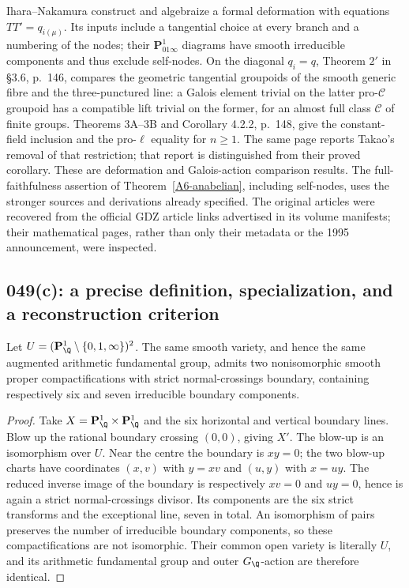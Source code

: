 Ihara--Nakamura \cite[\S2.3.6, equation $(5_\mu)$, p.~131;
Theorems 1 and $1'$, pp.~132--133]{IharaNakamura1997A567}
construct and algebraize a formal deformation with equations
$TT'=q_{i(\mu)}$. Its inputs include a tangential choice at every
branch and a numbering of the nodes; their $\mathbf P^1_{01\infty}$
diagrams have smooth irreducible components and thus exclude self-nodes.
On the diagonal $q_i=q$, Theorem $2'$ in \S3.6, p.~146, compares
the geometric tangential groupoids of the smooth generic fibre and
the three-punctured line: a Galois element trivial on the latter
pro-$\mathcal C$ groupoid has a compatible lift trivial on the former,
for an almost full class $\mathcal C$ of finite groups.
Theorems 3A--3B and Corollary 4.2.2, p.~148, give the constant-field
inclusion and the pro-$\ell$ equality for $n\ge1$.
The same page reports Takao's removal of that restriction;
that report is distinguished from their proved corollary.
These are deformation and Galois-action comparison results.
The full-faithfulness assertion of Theorem~\ref{A6-anabelian}, including
self-nodes, uses the stronger sources and derivations already specified.
The original articles were recovered from the official GDZ
article links advertised in its volume manifests; their mathematical
pages, rather than only their metadata or the 1995 announcement,
were inspected.

\subsection{049(c): a precise definition, specialization, and a reconstruction criterion}
\begin{proposition}\label{A6-blowup}
Let $U=(\mathbf P^1_\Q\setminus\{0,1,\infty\})^2$. The same smooth variety, and hence the same augmented arithmetic fundamental group, admits two nonisomorphic smooth proper compactifications with strict normal-crossings boundary, containing respectively six and seven irreducible boundary components.
\end{proposition}
\begin{proof}
Take $X=\mathbf P^1_\Q\times\mathbf P^1_\Q$ and the six horizontal and vertical boundary lines. Blow up the rational boundary crossing $(0,0)$, giving $X'$. The blow-up is an isomorphism over $U$. Near the centre the boundary is $xy=0$; the two blow-up charts have coordinates $(x,v)$ with $y=xv$ and $(u,y)$ with $x=uy$. The reduced inverse image of the boundary is respectively $xv=0$ and $uy=0$, hence is again a strict normal-crossings divisor. Its components are the six strict transforms and the exceptional line, seven in total. An isomorphism of pairs preserves the number of irreducible boundary components, so these compactifications are not isomorphic. Their common open variety is literally $U$, and its arithmetic fundamental group and outer $G_\Q$-action are therefore identical.
\end{proof}

